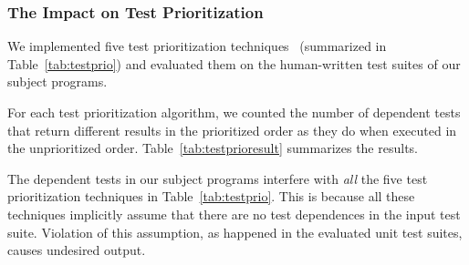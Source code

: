 
\subsubsection{The Impact on Test Prioritization}
\label{sec:impact}

We implemented five test prioritization techniques~\cite{Elbaum:2000:PTC:347324.348910} (summarized in Table~\ref{tab:testprio}) and
evaluated them on the human-written test suites of our subject programs.


For each test prioritization algorithm, we counted the number
of dependent tests that return different results in
the prioritized order as they do when executed in the
unprioritized order. Table~\ref{tab:testprioresult} summarizes
the results.

The dependent tests in our subject programs interfere with
\textit{all} the five test prioritization techniques in
Table~\ref{tab:testprio}. This is because all these techniques
implicitly assume that there are no test dependences in
the input test suite. Violation of this assumption, as
happened in the evaluated unit test suites, causes undesired output.





